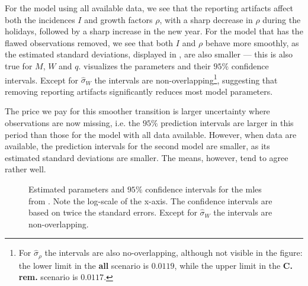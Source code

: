 For the model using all available data, we see that the reporting artifacts affect both the incidences $I$ and growth factors $\rho$, with a sharp decrease in $\rho$ during the holidays, followed by a sharp increase in the new year. For the model that has the flawed observations removed, we see that both $I$ and $\rho$ behave more smoothly, as the estimated standard deviations, displayed in , are also smaller --- this is also true for $M$, $W$ and $q$.  visualizes the parameters and their $95\%$ confidence intervals. Except for $\hat\sigma_{W}$ the intervals are non-overlapping\footnote{For $\hat\sigma_{ \rho}$ the intervals are also no-overlapping, although not visible in the figure: the lower limit in the \textbf{all} scenario is $0.0119$, while the upper limit in the \textbf{C. rem.} scenario is $0.0117$.}, suggesting that removing reporting artifacts significantly reduces most model parameters. 

The price we pay for this smoother transition is larger uncertainty where observations are now missing, i.e. the $95\%$ prediction intervals are larger in this period than those for the model with all data available. However, when data are available, the prediction intervals for the second model are smaller, as its estimated standard deviations are smaller. The means, however, tend to agree rather well. 

\begin{table}
    \centering
    
    \caption{Initial $\theta^{0}$ and \gls{mle} $\hat\theta$ for the model during the Christmas period, for all observations (\textbf{all}) or with observations during the Christmas period (19th December 2020 until January 17th 2021) removed (\textbf{C. rem.}). The manual parameter is based on the estimate of the models' showcase, i.e. the \gls{mle} result from . For \gls{mle} we additionally give estimated standard errors, based on the inverse Hessian at the optimal parameters and the delta method, as parameters are estimated on the log-scale. This neglects the simulation error due to importance sampling, see \citep[Section 11.6]{Durbin2012Time} for how to incorporate it. Nevertheless, as $N$ is set quite large ($N = 10\, 000$) we deem the simulation error to be negligible.}
    \label{tab:christmas-parameters}
\end{table}

\begin{figure}
    \resizebox{\textwidth}{!}{%
    }
    \caption{Estimated parameters and $95\%$ confidence intervals for the \glspl{mle} from . Note the log-scale of the x-axis. The confidence intervals are based on twice the standard errors. Except for $\hat\sigma_{W}$ the intervals are non-overlapping.}
    \label{fig:christmas_parameters_CI}
\end{figure}

